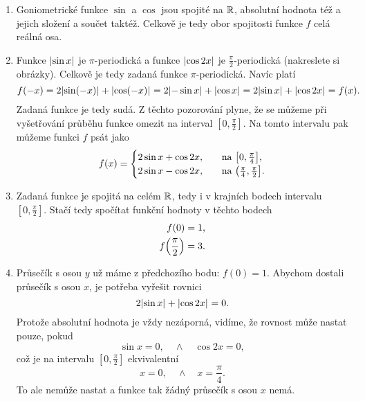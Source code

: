 \documentclass[answers]{exam}
\begin{document}
\begin{questions}
\begin{solution}
\begin{enumerate}
    	\item Goniometrické funkce $\sin$ a $\cos$ jsou spojité na $\mathbb{R}$, absolutní hodnota též a jejich složení a součet taktéž. Celkově je tedy obor spojitosti funkce $f$ celá reálná osa.
    	
    	\item Funkce $\abs{\sin x}$ je $\pi$-periodická a funkce $\abs{\cos 2x}$ je $\frac{\pi}{2}$-periodická (nakreslete si obrázky). Celkově je tedy zadaná funkce $\pi$-periodická. Navíc platí
    	\begin{equation*}
    		f(-x) = 2 \abs{\sin(-x)} + \abs{\cos(-x)} = 2 \abs{- \sin x} + \abs{\cos x} = 2 \abs{\sin x} + \abs{\cos 2x} = f(x).
    	\end{equation*}
    	Zadaná funkce je tedy sudá. Z těchto pozorování plyne, že se můžeme při vyšetřování průběhu funkce omezit na interval $[0, \frac{\pi}{2}]$. Na tomto intervalu pak můžeme funkci $f$ psát jako
    	\begin{equation}
    		\label{eq:1}
    		f(x)
    		=
    		\begin{cases}
    			2 \sin x + \cos 2x, &\quad \text{na $\brackets{0, \frac{\pi}{4}}$,}
    			\\
    			2 \sin x - \cos 2x, &\quad \text{na $\left( \frac{\pi}{4}, \frac{\pi}{2} \right]$.}
    		\end{cases}
    	\end{equation}
    	
    	\item \label{item:4b}
    		Zadaná funkce je spojitá na celém $\mathbb{R}$, tedy i v krajních bodech intervalu $[0, \frac{\pi}{2}]$. Stačí tedy spočítat funkční hodnoty v těchto bodech
    		\begin{align*}
    			f(0)
    			&=
    			1,
    			\\
    			f\parens{\frac{\pi}{2}}
    			&=
    			3.
    		\end{align*}
    	\item 
    		Průsečík s osou $y$ už máme z předchozího bodu: $f(0) = 1$. Abychom dostali průsečík s osou $x$, je potřeba vyřešit rovnici
    		\begin{equation*}
    			2 \abs{\sin x} + \abs{\cos 2x} = 0.
    		\end{equation*}
    		Protože absolutní hodnota je vždy nezáporná, vidíme, že rovnost může nastat pouze, pokud
    		\begin{equation*}
	    		\sin x = 0, \quad \land \quad \cos 2x = 0,
    		\end{equation*}
    		což je na intervalu $[0, \frac{\pi}{2}]$ ekvivalentní
    		\begin{equation*}
    			x = 0, \quad \land \quad x = \frac{\pi}{4}.
    		\end{equation*}
    		To ale nemůže nastat a funkce tak žádný průsečík s osou $x$ nemá.
    		

\end{enumerate}
\end{solution}
\end{questions}
\end{document}
